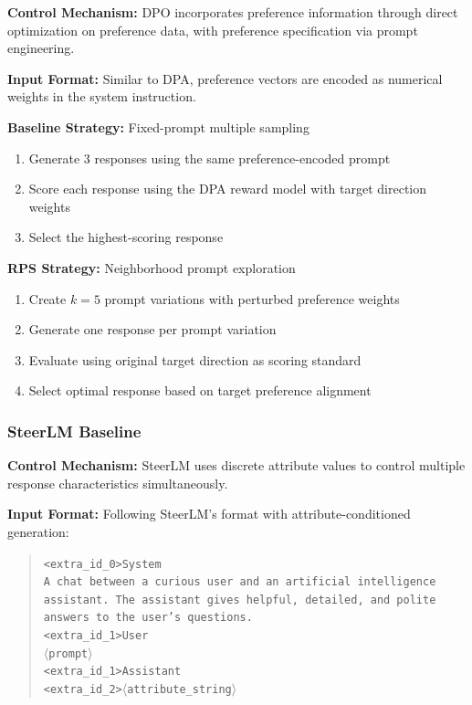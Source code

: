 \documentclass{article} %
\begin{document}
\textbf{Control Mechanism:} DPO incorporates preference information through direct optimization on preference data, with preference specification via prompt engineering.

\textbf{Input Format:} Similar to DPA, preference vectors are encoded as numerical weights in the system instruction.

\textbf{Baseline Strategy:} Fixed-prompt multiple sampling
\begin{enumerate}
    \item Generate 3 responses using the same preference-encoded prompt
    \item Score each response using the DPA reward model with target direction weights
    \item Select the highest-scoring response
\end{enumerate}

\textbf{RPS Strategy:} Neighborhood prompt exploration
\begin{enumerate}
    \item Create $k=5$ prompt variations with perturbed preference weights
    \item Generate one response per prompt variation
    \item Evaluate using original target direction as scoring standard
    \item Select optimal response based on target preference alignment
\end{enumerate}

\subsubsection{SteerLM Baseline}

\textbf{Control Mechanism:} SteerLM uses discrete attribute values to control multiple response characteristics simultaneously.

\textbf{Input Format:} Following SteerLM's format with attribute-conditioned generation:
\begin{quote}
\texttt{<extra\_id\_0>System} \\
\texttt{A chat between a curious user and an artificial intelligence assistant. The assistant gives helpful, detailed, and polite answers to the user's questions.} \\
\texttt{<extra\_id\_1>User} \\
\texttt{$\langle$prompt$\rangle$} \\
\texttt{<extra\_id\_1>Assistant} \\
\texttt{<extra\_id\_2>$\langle$attribute\_string$\rangle$}
\end{quote}
\end{document}
